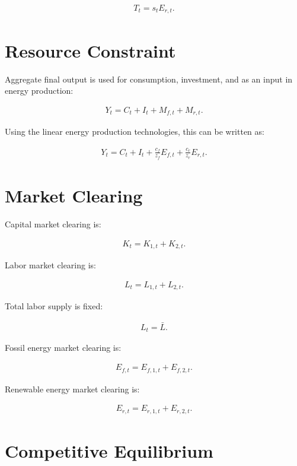 \documentclass[12pt]{article}
\begin{document}
\begin{align}
T_t
=
s_t E_{r,t}.
\end{align}

\section{Resource Constraint}

Aggregate final output is used for consumption, investment, and as an input in energy production:

\begin{align}
Y_t
=
C_t
+
I_t
+
M_{f,t}
+
M_{r,t}.
\end{align}

Using the linear energy production technologies, this can be written as:

\begin{align}
Y_t
=
C_t
+
I_t
+
\frac{c_f}{z_f}E_{f,t}
+
\frac{c_r}{z_r}E_{r,t}.
\end{align}

\section{Market Clearing}

Capital market clearing is:

\begin{align}
K_t
=
K_{1,t}
+
K_{2,t}.
\end{align}

Labor market clearing is:

\begin{align}
L_t
=
L_{1,t}
+
L_{2,t}.
\end{align}

Total labor supply is fixed:

\begin{align}
L_t = \bar{L}.
\end{align}

Fossil energy market clearing is:

\begin{align}
E_{f,t}
=
E_{f,1,t}
+
E_{f,2,t}.
\end{align}

Renewable energy market clearing is:

\begin{align}
E_{r,t}
=
E_{r,1,t}
+
E_{r,2,t}.
\end{align}

\section{Competitive Equilibrium}
\end{document}
